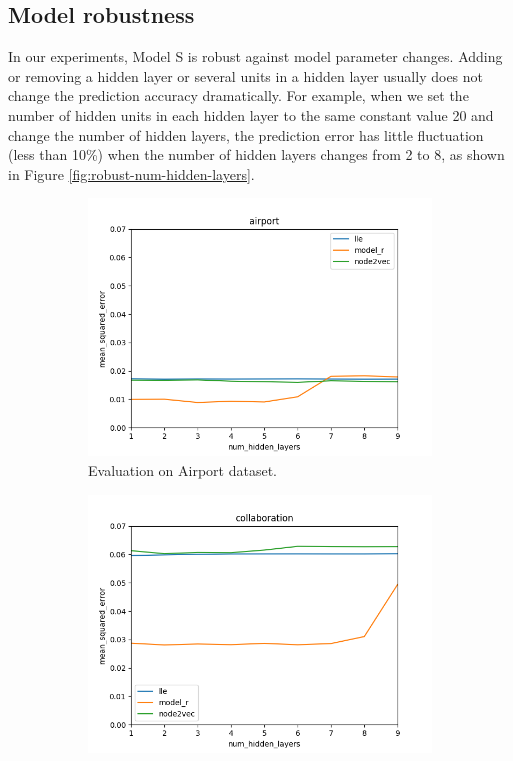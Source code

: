 \documentclass[12pt]{WSUThesis}
\theoremstyle{definition}
\begin{document}
\subsection{Model robustness}
In our experiments, Model S is robust against model parameter changes.
Adding or removing a hidden layer or several units in a hidden layer usually does not change the prediction accuracy dramatically.
For example, when we set the number of hidden units in each hidden layer to the same constant value 20 and change the number of hidden layers,
the prediction error has little fluctuation (less than 10\%) when the number of hidden layers changes from 2 to 8,
as shown in Figure \ref{fig:robust-num-hidden-layers}.
\begin{figure}[ht] \centering
	\begin{subfigure}{0.49 \linewidth}
		\includegraphics[width=\linewidth]{num_hidden_layers_airport}
		\caption{Evaluation on Airport dataset.}
	\end{subfigure}
	\begin{subfigure}{0.49 \linewidth}
		\includegraphics[width=\linewidth]{num_hidden_layers_collaboration}

\end{subfigure}
\end{figure}
\end{document}
